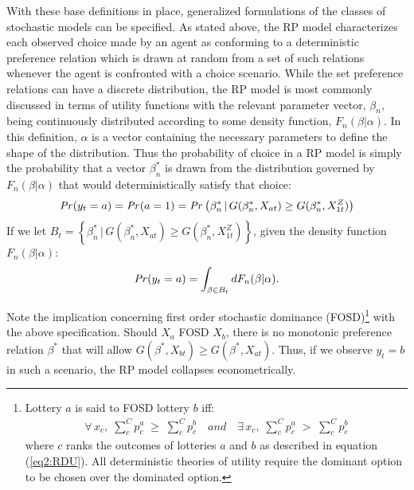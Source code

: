 \documentclass[../main.tex]{subfiles}
\begin{document}
With these base definitions in place, generalized formulations of the classes of stochastic models can be specified.
As stated above, the RP model characterizes each observed choice made by an agent as conforming to a deterministic preference relation which is drawn at random from a set of such relations whenever the agent is confronted with a choice scenario.
While the set preference relations can have a discrete distribution, the RP model is most commonly discussed in terms of utility functions with the relevant parameter vector, $\beta_n$, being continuously distributed according to some density function, $F_n(\beta | \alpha)$.
In this definition, $\alpha$ is a vector containing the necessary parameters to define the shape of the distribution.
Thus the probability of choice in a RP model is simply the probability that a vector $\beta_n^*$ is drawn from the distribution governed by $F_n(\beta | \alpha)$ that would deterministically satisfy that choice:
\begin{equation}
	\label{eq2:RP0}
	{\ensuremath{\mathit{Pr}}}(y_t=a) = {\mathit{Pr}}(a=1) = {\mathit{Pr}}\left( \beta_n^* \,|\, G(\beta_n^*,X_{at}) \geq G(\beta_n^*,X_{1t}^Z)\right)
\end{equation}
\noindent If we let $ B_t = \left\{ \beta_n^* \,|\, G(\beta_n^*,X_{at}) \geq G(\beta_n^*,X_{1t}^Z)\right\}$, given the density function $F_n(\beta | \alpha)$:
\begin{equation}
	\label{eq2:RP.f}
	{\ensuremath{\mathit{Pr}}}(y_t=a) = \int_{\beta \in B_t} dF_n(\beta|\alpha).
\end{equation}

Note the implication concerning first order stochastic dominance (FOSD)\footnote{
	Lottery $a$ is said to FOSD lottery $b$ iff:
	\begin{align*}
		\forall \, x_c , \; \sum_c^C p_c^a \; \geq \; \sum_c^C p_c^b \quad \textit{and} \quad \exists \, x_c , \; \sum_c^C p_c^a \; > \; \sum_c^C p_c^b
	\end{align*}
	where $c$ ranks the outcomes of lotteries $a$ and $b$ as described in equation (\ref{eq2:RDU}).
	All deterministic theories of utility require the dominant option to be chosen over the dominated option.} with the above specification. Should $X_a$ FOSD $X_b$, there is no monotonic preference relation $\beta^*$ that will allow $G(\beta^*,X_{bt}) \geq G(\beta^*,X_{at})$.
Thus, if we observe $y_t = b$ in such a scenario, the RP model collapses econometrically.
\end{document}
